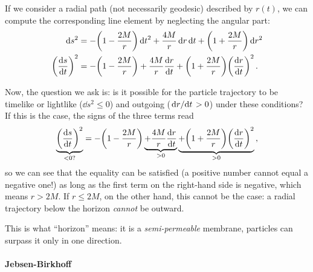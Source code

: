 \documentclass[main.tex]{subfiles}
\begin{document}
If we consider a radial path (not necessarily geodesic) described by \(r(t)\), we can compute the corresponding line element by neglecting the angular part: 
%
\begin{align}
\dd{s^2} &= - \qty(1 - \frac{2M}{r}) \dd{t}^2
+ \frac{4M}{r} \dd{r} \dd{t} + \qty(1 + \frac{2M}{r}) \dd{r^2}  \\
\qty( \dv{s}{t})^2 &= - \qty(1- \frac{2M}{r})
+ \frac{4M}{r} \dv{r}{t} + \qty(1 + \frac{2M}{r} ) \qty(\dv{r}{t})^2
\,.
\end{align}

Now, the question we ask is: is it possible for the particle trajectory to be timelike or lightlike (\(\dd{s}^2 \leq 0\)) and outgoing (\(\dv*{r}{t} > 0\)) under these conditions? If this is the case, the signs of the three terms read 
%
\begin{align}
\underbrace{\qty(\dv{s}{t})^2}_{< 0 ?}
= 
- \qty(1- \frac{2M}{r})
\underbrace{+ \frac{4M}{r} \dv{r}{t}}_{> 0 } \underbrace{+ \qty(1 + \frac{2M}{r} ) \qty(\dv{r}{t})^2}_{> 0}
\,,
\end{align}
%
so we can see that the equality can be satisfied (a positive number cannot equal a negative one!) as long as the first term on the right-hand side is negative, which means \(r > 2M\). 
If \(r \leq 2M\), on the other hand, this cannot be the case: a radial trajectory below the horizon \emph{cannot} be outward.

This is what ``horizon'' means: it is a \emph{semi-permeable} membrane, particles can surpass it only in one direction. 

\paragraph{Jebsen-Birkhoff}
\end{document}

